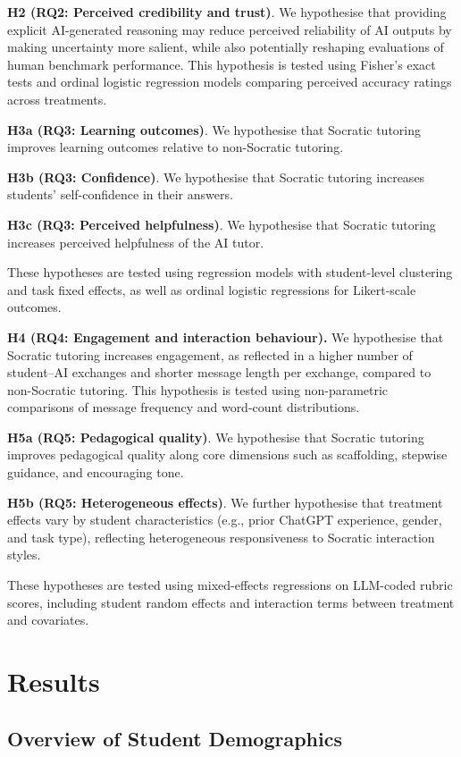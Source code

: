 \documentclass[
  11pt,
]{article}
\begin{document}
\textbf{H2 (RQ2: Perceived credibility and trust)}.
We hypothesise that providing explicit AI-generated reasoning may reduce perceived reliability of AI outputs by making uncertainty more salient, while also potentially reshaping evaluations of human benchmark performance. This hypothesis is tested using Fisher's exact tests and ordinal logistic regression models comparing perceived accuracy ratings across treatments.

\textbf{H3a (RQ3: Learning outcomes)}.
We hypothesise that Socratic tutoring improves learning outcomes relative to non-Socratic tutoring.

\textbf{H3b (RQ3: Confidence)}.
We hypothesise that Socratic tutoring increases students' self-confidence in their answers.

\textbf{H3c (RQ3: Perceived helpfulness)}.
We hypothesise that Socratic tutoring increases perceived helpfulness of the AI tutor.

These hypotheses are tested using regression models with student-level clustering and task fixed effects, as well as ordinal logistic regressions for Likert-scale outcomes.

\textbf{H4 (RQ4: Engagement and interaction behaviour).}
We hypothesise that Socratic tutoring increases engagement, as reflected in a higher number of student--AI exchanges and shorter message length per exchange, compared to non-Socratic tutoring. This hypothesis is tested using non-parametric comparisons of message frequency and word-count distributions.

\textbf{H5a (RQ5: Pedagogical quality)}.
We hypothesise that Socratic tutoring improves pedagogical quality along core dimensions such as scaffolding, stepwise guidance, and encouraging tone.

\textbf{H5b (RQ5: Heterogeneous effects)}. We further hypothesise that treatment effects vary by student characteristics (e.g., prior ChatGPT experience, gender, and task type), reflecting heterogeneous responsiveness to Socratic interaction styles.

These hypotheses are tested using mixed-effects regressions on LLM-coded rubric scores, including student random effects and interaction terms between treatment and covariates.

\section{Results}\label{sec:results}

\subsection{Overview of Student Demographics}\label{overview-of-student-demographics}
\end{document}
